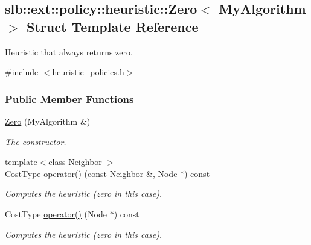 \hypertarget{structslb_1_1ext_1_1policy_1_1heuristic_1_1Zero}{}\subsection{slb\+:\+:ext\+:\+:policy\+:\+:heuristic\+:\+:Zero$<$ My\+Algorithm $>$ Struct Template Reference}
\label{structslb_1_1ext_1_1policy_1_1heuristic_1_1Zero}


Heuristic that always returns zero.  




{\ttfamily \#include $<$heuristic\+\_\+policies.\+h$>$}

\subsubsection*{Public Member Functions}
\begin{DoxyCompactItemize}
\item 
\hyperlink{structslb_1_1ext_1_1policy_1_1heuristic_1_1Zero_adb08aa1faa80b1752956b7ed4926cc95}{Zero} (My\+Algorithm \&)\hypertarget{structslb_1_1ext_1_1policy_1_1heuristic_1_1Zero_adb08aa1faa80b1752956b7ed4926cc95}{}\label{structslb_1_1ext_1_1policy_1_1heuristic_1_1Zero_adb08aa1faa80b1752956b7ed4926cc95}

\begin{DoxyCompactList}\small\item\em The constructor. \end{DoxyCompactList}\item 
{\footnotesize template$<$class Neighbor $>$ }\\Cost\+Type \hyperlink{structslb_1_1ext_1_1policy_1_1heuristic_1_1Zero_a8ae2cc4a0774d27ade5f13496f4672ba}{operator()} (const Neighbor \&, Node $\ast$) const 
\begin{DoxyCompactList}\small\item\em Computes the heuristic (zero in this case). \end{DoxyCompactList}\item 
Cost\+Type \hyperlink{structslb_1_1ext_1_1policy_1_1heuristic_1_1Zero_ac25cd5b9980135267181f3d2ab31390a}{operator()} (Node $\ast$) const 
\begin{DoxyCompactList}\small\item\em Computes the heuristic (zero in this case). \end{DoxyCompactList}\end{DoxyCompactItemize}
